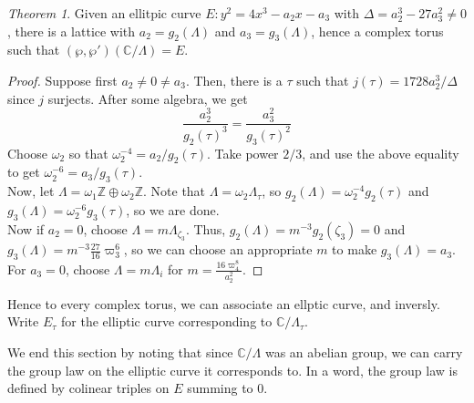 \documentclass[11pt]{article}
\theoremstyle{definition}
\theoremstyle{example}
\theoremstyle{remark}
\theoremstyle{lemma}
\theoremstyle{proposition}
\theoremstyle{Problem}
\theoremstyle{Solution}
\theoremstyle{theorem}
\newtheorem{theorem}{Theorem}[section]
\theoremstyle{corollary}
\begin{document}
\begin{theorem}
Given an ellitpic curve $E : y^2 = 4x^3-a_2x-a_3$ with $\Delta = a_2^3-27a_3^2\neq 0$, there is a lattice with $a_2 = g_2(\Lambda)$ and $a_3=g_3(\Lambda)$, hence a complex torus such that $(\wp, \wp')(\mathbb{C}/\Lambda) = E$.
\end{theorem}
\begin{proof}
Suppose first $a_2\neq0\neq a_3$. Then, there is a $\tau$ such that $j(\tau) = 1728a_2^3/\Delta$ since $j$ surjects. After some algebra, we get
$$\frac{a_2^3}{g_2(\tau)^3} = \frac{a_3^2}{g_3(\tau)^2}$$
Choose $\omega_2$ so that $\omega_2^{-4}=a_2/g_2(\tau)$. Take power $2/3$, and use the above equality to get $\omega_2^{-6} = a_3/g_3(\tau)$.\\
Now, let $\Lambda = \omega_1\mathbb{Z} \oplus \omega_2\mathbb{Z}$. Note that $\Lambda = \omega_2\Lambda_\tau$, so $g_2(\Lambda) = \omega_2^{-4}g_2(\tau)$ and $g_3(\Lambda) = \omega_2^{-6}g_3(\tau)$, so we are done.\\
Now if $a_2=0$, choose $\Lambda=m\Lambda_{\zeta_3}$. Thus, $g_2(\Lambda) = m^{-3}g_2(\zeta_3) = 0$ and $g_3(\Lambda) = m^{-3}\frac{27}{16}\varpi_3^6$, so we can choose an appropriate $m$ to make $g_3(\Lambda) = a_3$.\\
For $a_3=0$, choose $\Lambda=m\Lambda_{i}$ for $m = \frac{16\varpi_4^8}{a_2^2}$.
\end{proof}
Hence to every complex torus, we can associate an ellptic curve, and inversly. Write $E_\tau$ for the elliptic curve corresponding to $\mathbb{C}/\Lambda_\tau$.

We end this section by noting that since $\mathbb{C}/\Lambda$ was an abelian group, we can carry the group law on the elliptic curve it corresponds to. In a word, the group law is defined by colinear triples on $E$ summing to 0.
\end{document}
